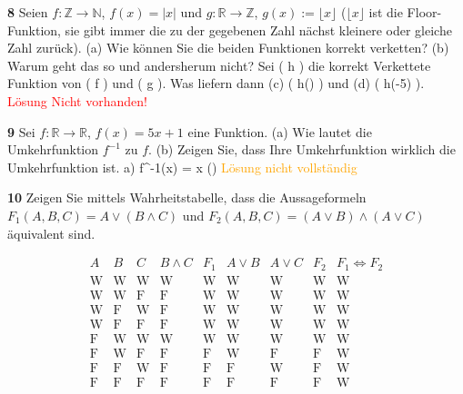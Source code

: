 \documentclass[11pt]{article}
\begin{document}
    \textbf{8} Seien \( f : \mathbb{Z} \rightarrow \mathbb{N} \), \( f(x) = |x| \) und \( g : \mathbb{R} \rightarrow \mathbb{Z} \), \( g(x) := \lfloor x \rfloor \) (\(\lfloor x \rfloor\) ist die Floor-Funktion, sie gibt immer die zu der gegebenen Zahl nächst kleinere oder gleiche Zahl zurück).
    (a) Wie können Sie die beiden Funktionen korrekt verketten? (b) Warum geht das so und andersherum nicht?
    Sei ( h ) die korrekt Verkettete Funktion von ( f ) und ( g ). Was liefern dann (c) ( h(\pi) ) und (d) ( h(-5) ).\newline
    \textcolor{red}{Lösung Nicht vorhanden!}\newline

    \textbf{9} Sei \( f : \mathbb{R} \rightarrow \mathbb{R} \), \( f(x) = 5x + 1 \) eine Funktion. (a) Wie lautet die Umkehrfunktion $f^{-1}$ zu $f$. (b) Zeigen Sie, dass Ihre Umkehrfunktion wirklich die Umkehrfunktion ist.\newline
    a) f^{-1}(x) = x \cdot ()\newline
    \textcolor{orange}{Lösung nicht vollständig}\newline

\textbf{10} Zeigen Sie mittels Wahrheitstabelle, dass die Aussageformeln \(F_1(A,B,C) = A \lor (B \land C)\) und \(F_2(A,B,C) = (A \lor B) \land (A \lor C)\) äquivalent sind.

\[
    \begin{array}{ccc|c|c|c|c|c|c|c}
        A & B & C & B \land C & F_1 & A \lor B & A \lor C & F_2 & F_1 \Leftrightarrow F_2 \\
        \hline
        \text{W} & \text{W} & \text{W} & \text{W} & \text{W} & \text{W} & \text{W} & \text{W} & \text{W} \\
        \text{W} & \text{W} & \text{F} & \text{F} & \text{W} & \text{W} & \text{W} & \text{W} & \text{W} \\
        \text{W} & \text{F} & \text{W} & \text{F} & \text{W} & \text{W} & \text{W} & \text{W} & \text{W} \\
        \text{W} & \text{F} & \text{F} & \text{F} & \text{W} & \text{W} & \text{W} & \text{W} & \text{W} \\
        \text{F} & \text{W} & \text{W} & \text{W} & \text{W} & \text{W} & \text{W} & \text{W} & \text{W} \\
        \text{F} & \text{W} & \text{F} & \text{F} & \text{F} & \text{W} & \text{F} & \text{F} & \text{W} \\
        \text{F} & \text{F} & \text{W} & \text{F} & \text{F} & \text{F} & \text{W} & \text{F} & \text{W} \\
        \text{F} & \text{F} & \text{F} & \text{F} & \text{F} & \text{F} & \text{F} & \text{F} & \text{W} \\
    \end{array}
\]
\end{document}
